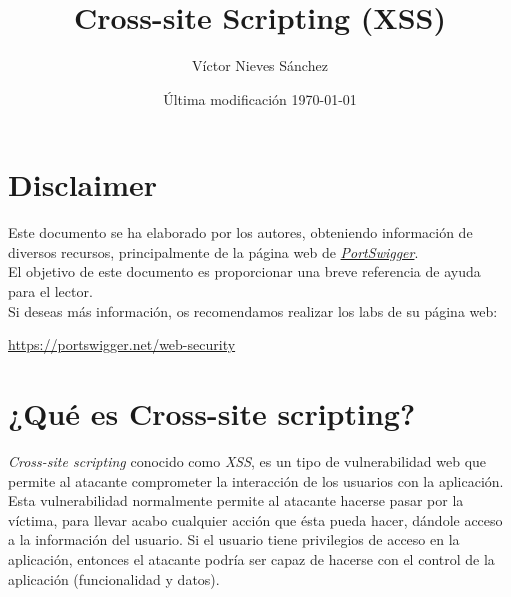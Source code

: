 \documentclass[bibliography=totocnumbered]{scrartcl}
\title{Cross-site Scripting (XSS)}
\author{Víctor Nieves Sánchez}
\date{Última modificación \today{}}
\newcommand{\changeurlcolor}[1]{\hypersetup{urlcolor=#1}}
\begin{document}
\maketitle
\section*{Disclaimer}
Este documento se ha elaborado por los autores, obteniendo información de diversos recursos, principalmente de la página web de \changeurlcolor{blue}\href{https://portswigger.net/web-security}{\textit{PortSwigger}}.\\
\changeurlcolor{black}
El objetivo de este documento es proporcionar una breve referencia de ayuda para el lector.\\

Si deseas más información, os recomendamos realizar los labs de su página web:
\begin{center}
\changeurlcolor{blue}\href{https://portswigger.net/web-security}{https://portswigger.net/web-security}    
\end{center}

\newpage
\tableofcontents

\newpage
\listoffigures

\newpage

\section{¿Qué es Cross-site scripting?}
\textit{Cross-site scripting} conocido como \textit{XSS}, es un tipo de vulnerabilidad web que permite al atacante comprometer la interacción de los usuarios con la aplicación. Esta vulnerabilidad normalmente permite al atacante hacerse pasar por la víctima, para llevar acabo cualquier acción que ésta pueda hacer, dándole acceso a la información del usuario. Si el usuario tiene privilegios de acceso en la aplicación, entonces el atacante podría ser capaz de hacerse con el control de la aplicación (funcionalidad y datos).
\end{document}
